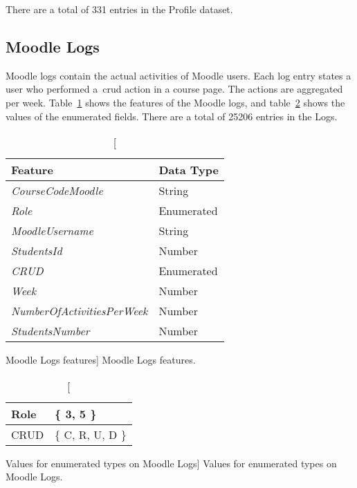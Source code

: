There are a total of 331 entries in the Profile dataset.

\subsection{Moodle Logs}
\label{sec:logs}

Moodle logs contain the actual activities of Moodle users. Each log entry
states a user who performed a~\gls{crud} action in a course page. The actions
are aggregated per week. Table~\ref{tab:moodle_logs_features} shows the
features of the Moodle logs, and table~\ref{tab:moodle_logs_enum} shows the
values of the enumerated fields. There are a total of 25206 entries in the
Logs.

\begin{table}[h!]
    \centering

    \begin{tabular}{l l}
        Feature                            & Data Type  \\ \hline
        \textit{CourseCodeMoodle}          & String     \\
        \textit{Role}                      & Enumerated \\
        \textit{MoodleUsername}            & String     \\
        \textit{StudentsId}                & Number     \\
        \textit{CRUD}                      & Enumerated \\
        \textit{Week}                      & Number     \\
        \textit{NumberOfActivitiesPerWeek} & Number     \\
        \textit{StudentsNumber}            & Number     \\
    \end{tabular}

    \caption
        [Moodle Logs features]
        {Moodle Logs features.}

    \label{tab:moodle_logs_features}
\end{table}

\begin{table}[h!]
    \centering

    \begin{tabular}{| l | l |}
        \hline
        Role & \{ 3, 5 \} \\ \hline
        CRUD & \{ C, R, U, D \}  \\ \hline
    \end{tabular}

    \caption
        [Values for enumerated types on Moodle Logs]
        {Values for enumerated types on Moodle Logs.}

    \label{tab:moodle_logs_enum}
\end{table}

